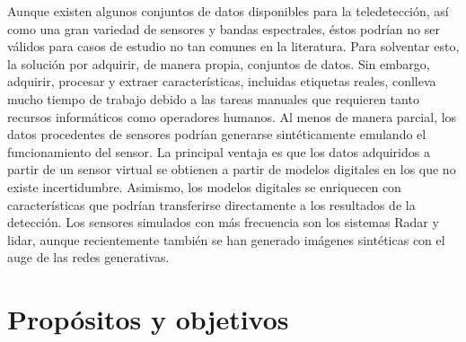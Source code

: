 Aunque existen algunos conjuntos de datos disponibles para la teledetección, así como una gran variedad de sensores y bandas espectrales, éstos podrían no ser válidos para casos de estudio no tan comunes en la literatura. Para solventar esto, la solución por adquirir, de manera propia, conjuntos de datos. Sin embargo, adquirir, procesar y extraer características, incluidas etiquetas reales, conlleva mucho tiempo de trabajo debido a las tareas manuales que requieren tanto recursos informáticos como operadores humanos. Al menos de manera parcial, los datos procedentes de sensores podrían generarse sintéticamente emulando el funcionamiento del sensor. La principal ventaja es que los datos adquiridos a partir de un sensor virtual se obtienen a partir de modelos digitales en los que no existe incertidumbre. Asimismo, los modelos digitales se enriquecen con características que podrían transferirse directamente a los resultados de la detección. Los sensores simulados con más frecuencia son los sistemas Radar y \acrshort{lidar}, aunque recientemente también se han generado imágenes sintéticas con el auge de las redes generativas.

\section{Propósitos y objetivos}

